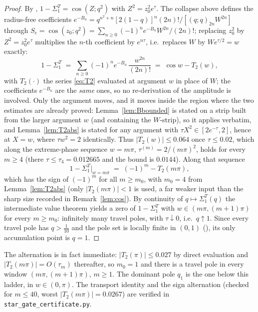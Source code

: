 \documentclass[11pt]{article}
\theoremstyle{plain}
\theoremstyle{definition}
\theoremstyle{remark}
\begin{document}
\begin{proof}
By {\cite[Proposition \textup{prop:qtrig}]{Bonfioli2026bA}}, $1-\Sigma_1^T=\cos(Z;q^2)$ with $Z^2=z_0^2e^{\tau}$. The collapse
above defines the radius-free coefficients $e^{-B_n}=q^{n^2+n}[2(1-q)]^n(2n)!/[(q;q)_{2n}W^{2n}]$
through $S_e=\cos(z_0;q^2)=\sum_{n\ge0}(-1)^ne^{-B_n}W^{2n}/(2n)!$; replacing $z_0^2$ by
$Z^2=z_0^2e^\tau$ multiplies the $n$-th coefficient by $e^{n\tau}$, i.e.\ replaces $W$ by
$We^{\tau/2}=w$ exactly:
\[
 1-\Sigma_1^T\;=\;\sum_{n\ge0}(-1)^n e^{-B_n}\,\frac{w^{2n}}{(2n)!}\;=\;\cos w-T_2(w),
\]
with $T_2(\cdot)$ the series \eqref{eq:T2} evaluated at argument $w$ in place of $W$; the
coefficients $e^{-B_n}$ are the \emph{same} ones, so no re-derivation of the amplitude is involved.
Only the argument moves, and it moves inside the region where the two estimates are already
proved: Lemma~\ref{lem:Bbounded} is stated on a strip built from the larger argument $w$ (and
containing the $W$-strip), so it applies verbatim, and Lemma~\ref{lem:T2abs} is stated for any
argument with $\tau X^2\in[2e^{-\tau},2]$, hence at $X=w$, where $\tau w^2=2$ identically. Thus
$|T_2(w)|\le0.064$ once $\tau\le0.02$, which along the extreme-phase sequence $w=m\pi$,
$\tau^{(m)}=2/(m\pi)^2$, holds for every $m\ge4$ (there $\tau\le\tau_4=0.012665$ and the bound is
$0.0144$). Along that sequence
\[
 1-\Sigma_1^T\big|_{w=m\pi}\;=\;(-1)^m-T_2(m\pi),
\]
which has the sign of $(-1)^m$ for all $m\ge m_0$, with $m_0=4$ from
Lemma~\ref{lem:T2abs} (only $|T_2(m\pi)|<1$ is used, a far weaker input than the sharp size
recorded in Remark~\ref{lem:cos}). By continuity of $q\mapsto\Sigma_1^T(q)$ the
intermediate value theorem yields a zero of $1-\Sigma_1^T$ with $w\in(m\pi,(m+1)\pi)$ for every
$m\ge m_0$: infinitely many travel poles, with $\tau\downarrow0$, i.e.\ $q\uparrow1$. Since every
travel pole has $q>\tfrac1{10}$ and the pole set is locally finite in $(0,1)$
({\cite[Lemma ``The travel poles are locally finite'', \textup{lem:polefinite}]{Bonfioli2026bA}}), its only accumulation point is $q=1$.
\end{proof}

\noindent The alternation is in fact immediate: $|T_2(\pi)|\le0.027$ by direct evaluation and
$|T_2(m\pi)|=O(\tau_m)$ thereafter, so $m_0=1$ and there is a travel pole in every window
$(m\pi,(m+1)\pi)$, $m\ge1$. The dominant pole $q_1$ is the one below this ladder, in
$w\in(0,\pi)$. The transport identity and the sign alternation (checked for $m\le40$, worst
$|T_2(m\pi)|=0.0267$) are verified in \texttt{star\_gate\_certificate.py}.
\end{document}

